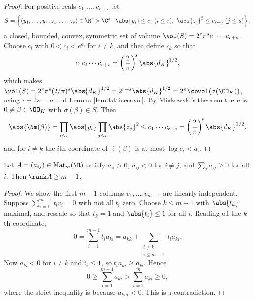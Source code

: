 \begin{proof}
	For positive reals $c_1,\dots,c_{r+s}$ let
	$$S = \left\{(y_1,\dots,y_r,z_1,\dots,z_s) \in \R^r\times\C^s : \abs{y_i}\le c_i \ (i\le r),\ \abs{z_j}^2\le c_{r+j}\ (j \le s)\right\},$$
	a closed, bounded, convex, symmetric set of volume $\vol(S) = 2^r\pi^sc_1\cdots c_{r+s}$. Choose $c_i$ with $0 < c_i < e^{a_i}$ for $i \neq k$, and then define $c_k$ so that
	$$c_1c_2\cdots c_{r+s} = \left(\frac2\pi\right)^{\!s}\abs{d_K}^{1/2},$$
	which makes $\vol(S) = 2^r\pi^s(2/\pi)^s\abs{d_K}^{1/2} = 2^{r+s}\abs{d_K}^{1/2} = 2^n\covol(\sigma(\OO_K))$, using $r+2s = n$ and Lemma \ref{lem:latticecovol}. By Minkowski's theorem there is $0 \neq \beta \in \OO_K$ with $\sigma(\beta)\in S$. Then
	$$\abs{\Nm(\beta)} = \prod_{i\le r}\abs{y_i}\prod_{j\le s}\abs{z_j}^2 \le c_1\cdots c_{r+s} = \left(\frac2\pi\right)^{\!s}\abs{d_K}^{1/2},$$
	and for $i \neq k$ the $i$th coordinate of $\ell(\beta)$ is at most $\log c_i < a_i$.
\end{proof}

\begin{lemma}\label{lem:rank}
	Let $A = (a_{ij}) \in \mathrm{Mat}_{m}(\R)$ satisfy $a_{ii} > 0$, $a_{ij} < 0$ for $i \neq j$, and $\sum_j a_{ij} \geq 0$ for all $i$. Then $\rank A \geq m-1$.
\end{lemma}

\begin{proof}
	We show the first $m-1$ columns $v_1,\dots,v_{m-1}$ are linearly independent. Suppose $\sum_{i=1}^{m-1}t_iv_i = 0$ with not all $t_i$ zero. Choose $k \le m-1$ with $\abs{t_k}$ maximal, and rescale so that $t_k = 1$ and $\abs{t_i}\le1$ for all $i$. Reading off the $k$th coordinate,
	$$0 = \sum_{i=1}^{m-1}t_ia_{ki} = a_{kk} + \sum_{\substack{i \neq k\\ i \le m-1}}t_ia_{ki}.$$
	Now $a_{ki} < 0$ for $i \neq k$ and $t_i \le 1$, so $t_ia_{ki} \ge a_{ki}$. Hence
	$$0 \geq \sum_{i=1}^{m-1}a_{ki} > \sum_{i=1}^{m}a_{ki} \geq 0,$$
	where the strict inequality is because $a_{km} < 0$. This is a contradiction.
\end{proof}

